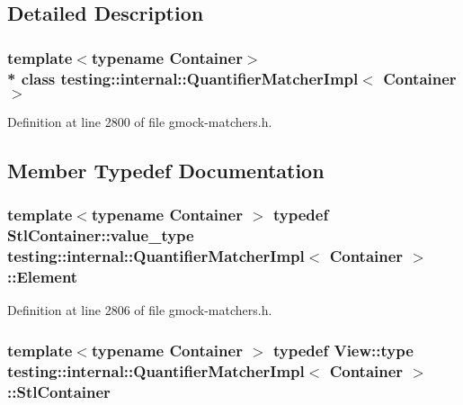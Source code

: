 \subsection{Detailed Description}
\subsubsection*{template$<$typename Container$>$\\*
class testing\+::internal\+::\+Quantifier\+Matcher\+Impl$<$ Container $>$}



Definition at line 2800 of file gmock-\/matchers.\+h.



\subsection{Member Typedef Documentation}
\subsubsection[{\texorpdfstring{Element}{Element}}]{\setlength{\rightskip}{0pt plus 5cm}template$<$typename Container $>$ typedef Stl\+Container\+::value\+\_\+type {\bf testing\+::internal\+::\+Quantifier\+Matcher\+Impl}$<$ Container $>$\+::{\bf Element}}\hypertarget{classtesting_1_1internal_1_1_quantifier_matcher_impl_a6f73e2e5fa853f8b5fdd33d6a1811f9e}{}\label{classtesting_1_1internal_1_1_quantifier_matcher_impl_a6f73e2e5fa853f8b5fdd33d6a1811f9e}


Definition at line 2806 of file gmock-\/matchers.\+h.

\subsubsection[{\texorpdfstring{Stl\+Container}{StlContainer}}]{\setlength{\rightskip}{0pt plus 5cm}template$<$typename Container $>$ typedef {\bf View\+::type} {\bf testing\+::internal\+::\+Quantifier\+Matcher\+Impl}$<$ Container $>$\+::{\bf Stl\+Container}}\hypertarget{classtesting_1_1internal_1_1_quantifier_matcher_impl_a7faa9a49c627e6db66e0ff9cdc88b6fc}{}\label{classtesting_1_1internal_1_1_quantifier_matcher_impl_a7faa9a49c627e6db66e0ff9cdc88b6fc}


